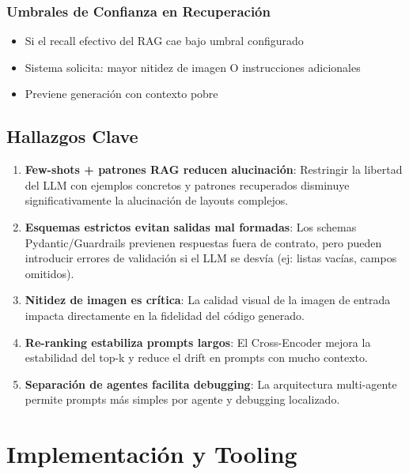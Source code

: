 \documentclass[12pt,a4paper]{article}
\begin{document}
\subsubsection{Umbrales de Confianza en Recuperación}

\begin{itemize}
    \item Si el recall efectivo del RAG cae bajo umbral configurado
    \item Sistema solicita: mayor nitidez de imagen O instrucciones adicionales
    \item Previene generación con contexto pobre
\end{itemize}

\subsection{Hallazgos Clave}

\begin{enumerate}
    \item \textbf{Few-shots + patrones RAG reducen alucinación}: Restringir la libertad del LLM con ejemplos concretos y patrones recuperados disminuye significativamente la alucinación de layouts complejos.
    
    \item \textbf{Esquemas estrictos evitan salidas mal formadas}: Los schemas Pydantic/Guardrails previenen respuestas fuera de contrato, pero pueden introducir errores de validación si el LLM se desvía (ej: listas vacías, campos omitidos).
    
    \item \textbf{Nitidez de imagen es crítica}: La calidad visual de la imagen de entrada impacta directamente en la fidelidad del código generado.
    
    \item \textbf{Re-ranking estabiliza prompts largos}: El Cross-Encoder mejora la estabilidad del top-k y reduce el drift en prompts con mucho contexto.
    
    \item \textbf{Separación de agentes facilita debugging}: La arquitectura multi-agente permite prompts más simples por agente y debugging localizado.
\end{enumerate}

\section{Implementación y Tooling}
\end{document}
